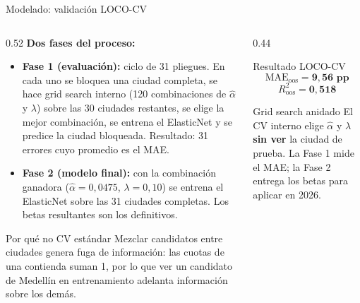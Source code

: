 \begin{frame}{Modelado: validación LOCO-CV \corr{[Corr.\ 2.3]}}
  \begin{columns}[T]
    \begin{column}{0.52\textwidth}
      \textbf{Dos fases del proceso:}
      \begin{itemize}\small
        \item \textbf{Fase 1 (evaluación):} ciclo de 31 pliegues. En cada uno se bloquea
              una ciudad completa, se hace grid search interno (120 combinaciones de
              $\hat\alpha$ y $\lambda$) sobre las 30 ciudades restantes, se elige la
              mejor combinación, se entrena el ElasticNet y se predice la ciudad
              bloqueada. Resultado: 31 errores cuyo promedio es el MAE.
        \item \textbf{Fase 2 (modelo final):} con la combinación ganadora
              ($\hat\alpha=0{,}0475$, $\lambda=0{,}10$) se entrena el ElasticNet sobre
              las 31 ciudades completas. Los betas resultantes son los definitivos.
      \end{itemize}
      \vspace{0.2em}
      \begin{alertblock}{\small Por qué no CV estándar}
        \small Mezclar candidatos entre ciudades genera fuga de información:
        las cuotas de una contienda suman 1, por lo que ver un candidato de
        Medellín en entrenamiento adelanta información sobre los demás.
      \end{alertblock}
    \end{column}
    \begin{column}{0.44\textwidth}
      \begin{exampleblock}{Resultado LOCO-CV}
        \large
        \[\text{MAE}_{\text{oos}} = \mathbf{9{,}56\text{ pp}}\]
        \[R^2_{\text{oos}} = \mathbf{0{,}518}\]
      \end{exampleblock}
      \vspace{0.3em}
      \begin{block}{Grid search anidado}
        \small El CV interno elige $\hat\alpha$ y $\lambda$ \textbf{sin ver}
        la ciudad de prueba. La Fase 1 mide el MAE; la Fase 2 entrega los
        betas para aplicar en 2026.
      \end{block}
    \end{column}
  \end{columns}
\end{frame}

